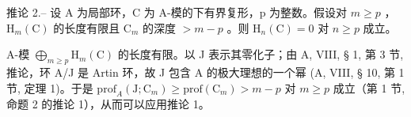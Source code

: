 推论 2.-- 设 A 为局部环，C 为 A-模的下有界复形，p 为整数。假设对 \(m \geqslant p\) ，\(\mathrm{H}_{m}(\mathrm{C})\) 的长度有限且 \(\mathrm{C}_{m}\) 的深度 \(>m-p\) 。则 \(\mathrm{H}_{n}(\mathrm{C}) = 0\) 对 \(n \geqslant p\) 成立。

A-模 \(\bigoplus_{m\geqslant p}\mathrm{H}_{m}(\mathrm{C})\) 的长度有限。以 J 表示其零化子；由 A, VIII, § 1, 第 3 节, 推论，环 A/J 是 Artin 环，故 J 包含 A 的极大理想的一个幂 (A, VIII, § 10, 第 1 节, 定理 1)。于是 \(\mathrm{prof}_A(\mathrm{J};\mathrm{C}_m)\geqslant \mathrm{prof}(\mathrm{C}_m) > m - p\) 对 \(m\geqslant p\) 成立（第 1 节, 命题 2 的推论 1），从而可以应用推论 1。

